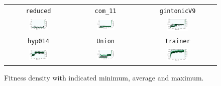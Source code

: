 \documentclass[11pt,a4paper]{scrartcl}
\begin{document}
\begin{figure}[H]
\center
\begin{tabular}{ccc}
\texttt{reduced} & \texttt{com\_11} & \texttt{gintonicV9} \\
\includegraphics[width=0.3\textwidth]{img/self_adapt_1_reduced.png} &
\includegraphics[width=0.3\textwidth]{img/self_adapt_1_com_11.png} &
\includegraphics[width=0.3\textwidth]{img/self_adapt_1_gintonicV9.png} \\
\texttt{hyp014} & \texttt{Union} & \texttt{trainer} \\
\includegraphics[width=0.3\textwidth]{img/self_adapt_1_hyp014.png} &
\includegraphics[width=0.3\textwidth]{img/self_adapt_1_Union.png} &
\includegraphics[width=0.3\textwidth]{img/self_adapt_1_trainer.png}
\end{tabular}
\caption{Fitness density with indicated minimum, average and maximum.}
\label{fig:self_adapt_1}
\end{figure}
\end{document}
